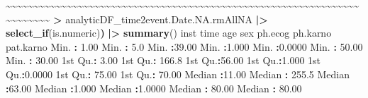 \documentclass[
]{article}
\newenvironment{Shaded}{\begin{snugshade}}{\end{snugshade}}
\newcommand{\ErrorTok}[1]{\textcolor[rgb]{0.64,0.00,0.00}{\textbf{#1}}}
\newcommand{\FloatTok}[1]{\textcolor[rgb]{0.00,0.00,0.81}{#1}}
\newcommand{\FunctionTok}[1]{\textcolor[rgb]{0.13,0.29,0.53}{\textbf{#1}}}
\newcommand{\NormalTok}[1]{#1}
\newcommand{\SpecialCharTok}[1]{\textcolor[rgb]{0.81,0.36,0.00}{\textbf{#1}}}
\begin{document}
\begin{Shaded}
\begin{Highlighting}[]
    \SpecialCharTok{\textasciitilde{}}\ErrorTok{\textasciitilde{}\textasciitilde{}\textasciitilde{}\textasciitilde{}\textasciitilde{}\textasciitilde{}\textasciitilde{}\textasciitilde{}\textasciitilde{}\textasciitilde{}\textasciitilde{}\textasciitilde{}\textasciitilde{}\textasciitilde{}\textasciitilde{}\textasciitilde{}\textasciitilde{}\textasciitilde{}\textasciitilde{}\textasciitilde{}\textasciitilde{}\textasciitilde{}\textasciitilde{}\textasciitilde{}\textasciitilde{}\textasciitilde{}\textasciitilde{}\textasciitilde{}\textasciitilde{}\textasciitilde{}\textasciitilde{}\textasciitilde{}\textasciitilde{}\textasciitilde{}\textasciitilde{}\textasciitilde{}\textasciitilde{}\textasciitilde{}\textasciitilde{}\textasciitilde{}\textasciitilde{}\textasciitilde{}\textasciitilde{}\textasciitilde{}\textasciitilde{}\textasciitilde{}\textasciitilde{}\textasciitilde{}\textasciitilde{}\textasciitilde{}\textasciitilde{}\textasciitilde{}\textasciitilde{}\textasciitilde{}\textasciitilde{}\textasciitilde{}\textasciitilde{}\textasciitilde{}\textasciitilde{}\textasciitilde{}\textasciitilde{}\textasciitilde{}\textasciitilde{}\textasciitilde{}\textasciitilde{}\textasciitilde{}\textasciitilde{}\textasciitilde{}\textasciitilde{}\textasciitilde{}\textasciitilde{}}    
 \ErrorTok{\textgreater{}}\NormalTok{ analyticDF\_time2event.Date.NA.rmAllNA }\SpecialCharTok{|\textgreater{}} \FunctionTok{select\_if}\NormalTok{(is.numeric)}\ErrorTok{)} \SpecialCharTok{|\textgreater{}} \FunctionTok{summary}\NormalTok{()  }
\NormalTok{      inst            time             age             sex           ph.ecog          ph.karno        pat.karno     }
\NormalTok{ Min.   }\SpecialCharTok{:} \FloatTok{1.00}\NormalTok{   Min.   }\SpecialCharTok{:}   \FloatTok{5.0}\NormalTok{   Min.   }\SpecialCharTok{:}\FloatTok{39.00}\NormalTok{   Min.   }\SpecialCharTok{:}\FloatTok{1.000}\NormalTok{   Min.   }\SpecialCharTok{:}\FloatTok{0.0000}\NormalTok{   Min.   }\SpecialCharTok{:} \FloatTok{50.00}\NormalTok{   Min.   }\SpecialCharTok{:} \FloatTok{30.00}  
\NormalTok{ 1st Qu.}\SpecialCharTok{:} \FloatTok{3.00}\NormalTok{   1st Qu.}\SpecialCharTok{:} \FloatTok{166.8}\NormalTok{   1st Qu.}\SpecialCharTok{:}\FloatTok{56.00}\NormalTok{   1st Qu.}\SpecialCharTok{:}\FloatTok{1.000}\NormalTok{   1st Qu.}\SpecialCharTok{:}\FloatTok{0.0000}\NormalTok{   1st Qu.}\SpecialCharTok{:} \FloatTok{75.00}\NormalTok{   1st Qu.}\SpecialCharTok{:} \FloatTok{70.00}  
\NormalTok{ Median }\SpecialCharTok{:}\FloatTok{11.00}\NormalTok{   Median }\SpecialCharTok{:} \FloatTok{255.5}\NormalTok{   Median }\SpecialCharTok{:}\FloatTok{63.00}\NormalTok{   Median }\SpecialCharTok{:}\FloatTok{1.000}\NormalTok{   Median }\SpecialCharTok{:}\FloatTok{1.0000}\NormalTok{   Median }\SpecialCharTok{:} \FloatTok{80.00}\NormalTok{   Median }\SpecialCharTok{:} \FloatTok{80.00}  

\end{Highlighting}
\end{Shaded}
\end{document}
